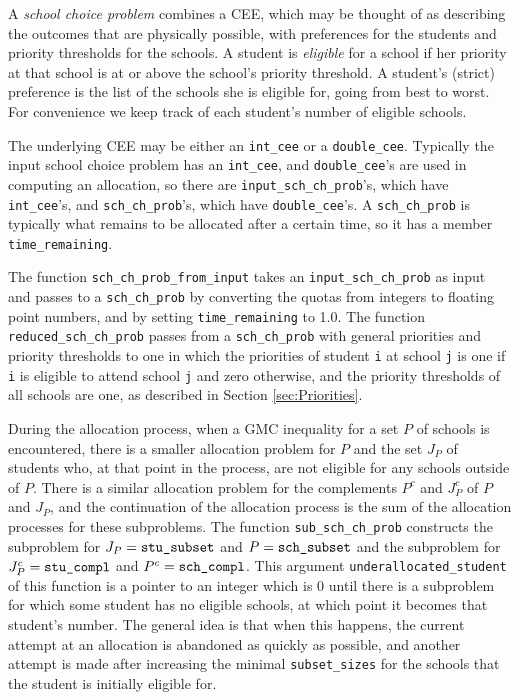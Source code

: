 \documentclass[12pt]{article}
\theoremstyle{definition}
\begin{document}
\begin{appendix}
A \emph{school choice problem} combines a CEE, which may be thought of
as describing the outcomes that are physically possible, with
preferences for the students and priority thresholds for the schools.
A student is \emph{eligible} for a school if her priority at that
school is at or above the school's priority threshold. A student's
(strict) preference is the list of the schools she is eligible for,
going from best to worst.  For convenience we keep track of each
student's number of eligible schools.

The underlying CEE may be either an \texttt{int\_cee} or a
\texttt{double\_cee}.  Typically the input school choice problem has
an \texttt{int\_cee}, and \texttt{double\_cee}'s are used in computing
an allocation, so there are \texttt{input\_sch\_ch\_prob}'s, which
have \texttt{int\_cee}'s, and \texttt{sch\_ch\_prob}'s, which have
\texttt{double\_cee}'s.  A \texttt{sch\_ch\_prob} is typically what
remains to be allocated after a certain time, so it has a member
\texttt{time\_remaining}.

The function \texttt{sch\_ch\_prob\_from\_input} takes an
\texttt{input\_sch\_ch\_prob} as input and passes to a
\texttt{sch\_ch\_prob} by converting the quotas from integers to
floating point numbers, and by setting \texttt{time\_remaining} to
1.0.  The function \texttt{reduced\_sch\_ch\_prob} passes from a
\texttt{sch\_ch\_prob} with general priorities and priority thresholds
to one in which the priorities of student \texttt{i} at school
\texttt{j} is one if \texttt{i} is eligible to attend school
\texttt{j} and zero otherwise, and the priority thresholds of all
schools are one, as described in Section \ref{sec:Priorities}.

During the allocation process, when a GMC inequality for a set $P$ of
schools is encountered, there is a smaller allocation problem for $P$
and the set $J_P$ of students who, at that point in the process, are
not eligible for any schools outside of $P$.  There is a similar
allocation problem for the complements $P^c$ and $J_P^c$ of $P$ and
$J_P$, and the continuation of the allocation process is the sum of
the allocation processes for these subproblems.  The function
\texttt{sub\_sch\_ch\_prob} constructs the subproblem for $J_P =
\text{\texttt{stu\_subset}}$ and $P = \text{\texttt{sch\_subset}}$ and
the subproblem for $J_P^c = \text{\texttt{stu\_compl}}$ and $P^c =
\text{\texttt{sch\_compl}}$.  This argument
\texttt{underallocated\_student} of this function is a pointer to an
integer which is $0$ until there is a subproblem for which some
student has no eligible schools, at which point it becomes that
student's number.  The general idea is that when this happens, the
current attempt at an allocation is abandoned as quickly as possible,
and another attempt is made after increasing the minimal
\texttt{subset\_sizes} for the schools that the student is initially
eligible for.


\end{appendix}
\end{document}

